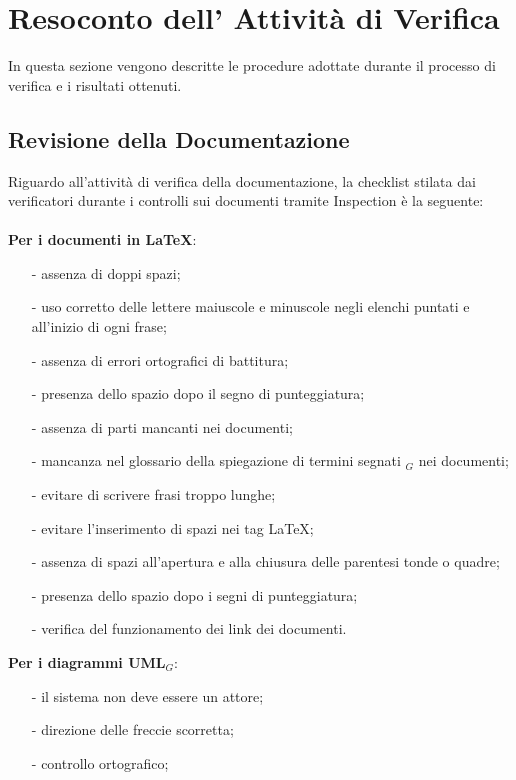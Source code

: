 \section{Resoconto dell' Attività di Verifica}
In questa sezione vengono descritte le procedure adottate durante il processo di
verifica e i risultati ottenuti.
\subsection{Revisione della Documentazione}
Riguardo all'attività di verifica della documentazione, la checklist stilata dai verificatori durante i controlli sui documenti tramite Inspection è la seguente:\\ \\
\textbf{Per i documenti in \LaTeX}:
\begin{itemize}
	\item[-] assenza di doppi spazi;
	\item[-] uso corretto delle lettere maiuscole e minuscole negli elenchi puntati e all'inizio di ogni frase;
	\item[-] assenza di errori ortografici di battitura;
	\item[-] presenza dello spazio dopo il segno di punteggiatura; 
	\item[-] assenza di parti mancanti nei documenti;
	\item[-] mancanza nel glossario della spiegazione di termini segnati $_G$ nei documenti;
	\item[-] evitare di scrivere frasi troppo lunghe;
	\item[-] evitare l'inserimento di spazi nei tag \LaTeX{};
	\item[-] assenza di spazi all'apertura e alla chiusura delle parentesi tonde o quadre;
	\item[-] presenza dello spazio dopo i segni di punteggiatura; 
	\item[-] verifica del funzionamento dei link dei documenti.
\end{itemize}
\textbf{Per i diagrammi UML$_G$}:
\begin{itemize}
	\item[-] il sistema non deve essere un attore;
	\item[-] direzione delle freccie scorretta;
	\item[-] controllo ortografico;
\end{itemize}
